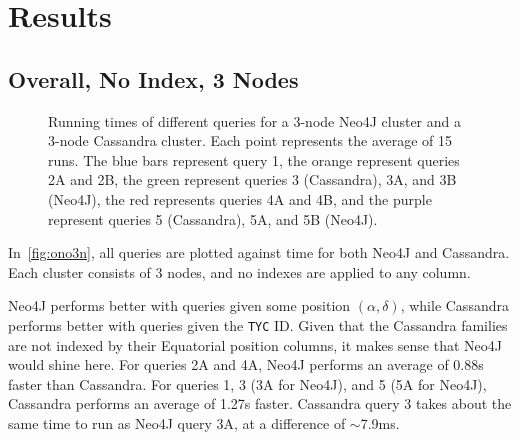 \section{Results}\label{sec:results}

\subsection{Overall, No Index, 3 Nodes}\label{subsec:overallNoIndex3Nodes}
\begin{figure}
    \caption{Running times of different queries for a 3-node Neo4J cluster and a 3-node Cassandra cluster.
    Each point represents the average of 15 runs.
    The blue bars represent query 1, the orange represent queries 2A and 2B, the green represent queries 3
    (Cassandra), 3A, and 3B (Neo4J), the red represents queries 4A and 4B, and the purple represent queries 5
    (Cassandra), 5A, and 5B (Neo4J).}\label{fig:ono3n}
\end{figure}

In~\autoref{fig:ono3n}, all queries are plotted against time for both Neo4J and Cassandra.
Each cluster consists of 3 nodes, and no indexes are applied to any column.

Neo4J performs better with queries given some position $(\alpha, \delta)$, while Cassandra performs better with
queries given the \texttt{TYC} ID\@.
Given that the Cassandra families are not indexed by their Equatorial position columns, it makes sense
that Neo4J would shine here.
For queries 2A and 4A, Neo4J performs an average of 0.88s faster than Cassandra.
For queries 1, 3 (3A for Neo4J), and 5 (5A for Neo4J), Cassandra performs an average of 1.27s faster.
Cassandra query 3 takes about the same time to run as Neo4J query 3A, at a difference of $\sim$7.9ms.

